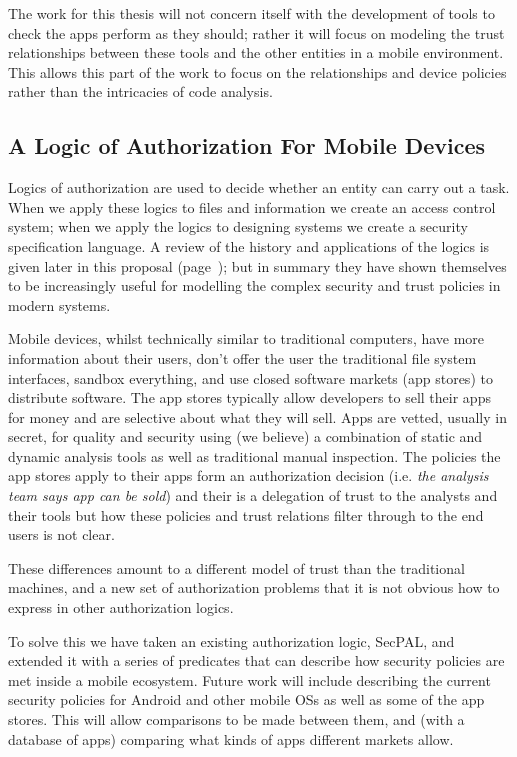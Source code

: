 \documentclass[a4paper,sfsidenotes]{tufte-book}
\begin{document}
The work for this thesis will not concern itself with the development of tools
to check the apps perform as they should; rather it will focus on modeling the
trust relationships between these tools and the other entities in a mobile
environment.  This allows this part of the work to focus on the relationships
and device policies rather than the intricacies of code analysis.


\subsection{A Logic of Authorization For Mobile Devices}

Logics of authorization are used to decide whether an entity can carry out a
task.  When we apply these logics to files and information we create an access
control system; when we apply the logics to designing systems we create a
security specification language.  A review of the history and applications of
the logics is given later in this proposal (page~\pageref{sec:pollang}); but in
summary they have shown themselves to be increasingly useful for modelling the
complex security and trust policies in modern systems.

Mobile devices, whilst technically similar to traditional computers, have more
information about their users, don't offer the user the traditional file system
interfaces, sandbox everything, and use closed software markets (app stores) to
distribute software.  The app stores typically allow developers to sell their
apps for money and are selective about what they will sell.  Apps are vetted,
usually in secret, for quality and security using (we believe) a combination of
static and dynamic analysis tools as well as traditional manual inspection.
The policies the app stores apply to their apps form an authorization decision
(i{.}e{.} \emph{the analysis team says app can be sold}) and their is a
delegation of trust to the analysts and their tools but how these policies and
trust relations filter through to the end users is not clear.

These differences amount to a different model of trust
than the traditional machines, and a new set of authorization problems that it
is not obvious how to express in other authorization logics. 

To solve this we have taken an existing authorization logic,
SecPAL\cite{Becker:2006vh}, and extended it with a series of predicates that can
describe how security policies are met inside a mobile ecosystem.  Future work
will include describing the current security policies for Android and other
mobile OSs as well as some of the app stores.  This will allow comparisons to be
made between them, and (with a database of apps) comparing what kinds of apps
different markets allow.
\end{document}
